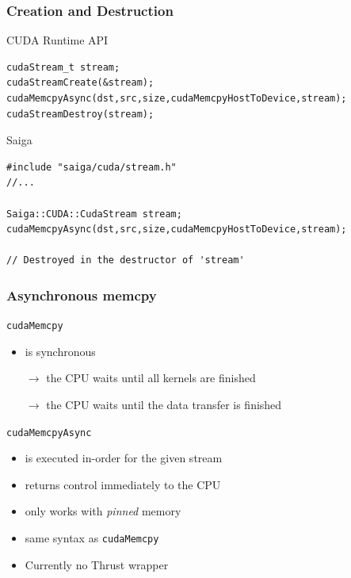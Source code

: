 \documentclass[aspectratio=169,handout]{beamer}
\begin{document}
\begin{frame}[fragile]
\frametitle{Creation and Destruction}

CUDA Runtime API
\begin{lstlisting}
cudaStream_t stream;
cudaStreamCreate(&stream);
cudaMemcpyAsync(dst,src,size,cudaMemcpyHostToDevice,stream);
cudaStreamDestroy(stream);
\end{lstlisting}

Saiga
\begin{lstlisting}
#include "saiga/cuda/stream.h"
//...

Saiga::CUDA::CudaStream stream;
cudaMemcpyAsync(dst,src,size,cudaMemcpyHostToDevice,stream);

// Destroyed in the destructor of 'stream'
\end{lstlisting}
\end{frame}

\begin{frame}[fragile]
\frametitle{Asynchronous memcpy}
\texttt{cudaMemcpy}
\begin{itemize}
	\item is synchronous
	\item[$\rightarrow$] the CPU waits until all kernels are finished
	\item[$\rightarrow$] the CPU waits until the data transfer is finished
\end{itemize}
\texttt{cudaMemcpyAsync}
\begin{itemize}
	\item<2-> is executed in-order for the given stream
	\item<3-> returns control immediately to the CPU
	\item<4-> only works with \textit{pinned} memory
	\item<5-> same syntax as \texttt{cudaMemcpy}
	\item<6-> Currently no Thrust wrapper
\end{itemize}
\end{frame}
\end{document}
